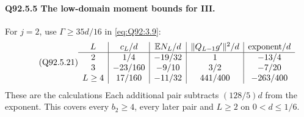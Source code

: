\paragraph{Q92.5.5 The low-domain moment bounds for III.}
For \(j=\allowbreak 2\), use \(\Gamma\ge\allowbreak 35d/16\) in \eqref{eq:Q92:3.9}:
\begin{equation}\tag{Q92.5.21}\label{eq:Q92:5.21}
\begin{array}{c|c|c|c|c}
L&c_L/d&\mathbb E N_L/d&\|Q_{L-1}g'\|^2/d&\text{exponent}/d\\\hline
2&1/4&-19/32&1&-13/4\\
3&-23/160&-9/10&3/2&-7/20\\
L\ge4&17/160&-11/32&441/400&-263/400
\end{array}
\end{equation}
These are the calculations
Each additional pair subtracts \((128/5)d\) from the exponent.
This covers every \(b_2\ge\allowbreak 4\), every later pair and \(L\ge\allowbreak 2\) on
\(0<\allowbreak d\le\allowbreak 1/6\).

